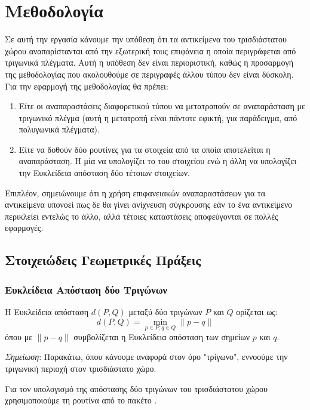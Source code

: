 \chapter{Μεθοδολογία}
\label{ch:methodology}

Σε αυτή την εργασία κάνουμε την υπόθεση ότι τα αντικείμενα του 
τρισδιάστατου χώρου αναπαρίστανται από την εξωτερική τους επιφάνεια 
η οποία περιγράφεται από τριγωνικά πλέγματα. 
Αυτή η υπόθεση δεν είναι περιοριστική, καθώς η προσαρμογή της μεθοδολογίας 
που ακολουθούμε σε περιγραφές άλλου τύπου δεν είναι δύσκολη.
Για την εφαρμογή της μεθοδολογίας θα πρέπει:
\begin{enumerate}
    \item Είτε οι αναπαραστάσεις διαφορετικού τύπου να μετατραπούν σε αναπαράσταση 
    με τριγωνικό πλέγμα (αυτή η μετατροπή είναι πάντοτε εφικτή, για παράδειγμα, 
    από πολυγωνικά πλέγματα).
    \item Είτε να δοθούν δύο ρουτίνες για τα στοιχεία από τα οποία αποτελείται η 
    αναπαράσταση. Η μία να υπολογίζει το  του στοιχείου 
    ενώ η άλλη να υπολογίζει την Ευκλείδεια απόσταση δύο τέτοιων στοιχείων.
\end{enumerate}
Επιπλέον, σημειώνουμε ότι η χρήση επιφανειακών αναπαραστάσεων για τα αντικείμενα 
υπονοεί πως δε θα γίνει ανίχνευση σύγκρουσης εάν το ένα αντικείμενο περικλείει 
εντελώς το άλλο, αλλά τέτοιες καταστάσεις αποφεύγονται σε πολλές εφαρμογές.


\section{Στοιχειώδεις Γεωμετρικές Πράξεις}
\subsection{Ευκλείδεια Απόσταση δύο Τριγώνων}
\label{subsec:tria_distance}
Η Ευκλείδεια απόσταση $d(P,Q)$ μεταξύ δύο τριγώνων $P$ και $Q$
ορίζεται ως:
\[ d(P,Q) = \min_{p \in P, q \in Q} \lVert p - q \rVert \]
όπου με $\lVert p - q \rVert$ συμβολίζεται η Ευκλείδεια 
απόσταση των σημείων $p$ και $q$.

\textit{Σημείωση}: Παρακάτω, όπου κάνουμε αναφορά στον όρο "τρίγωνο",
εννοούμε την τριγωνική περιοχή στον τρισδιάστατο χώρο.

Για τον υπολογισμό της απόστασης δύο τριγώνων του τρισδιάστατου χώρου 
χρησιμοποιούμε τη ρουτίνα  από το πακέτο 
 \cite{larsen2014pqp} \cite{larsen1999fast} 
\cite{larsen845311l} \cite{shellshear2014fast}.  

